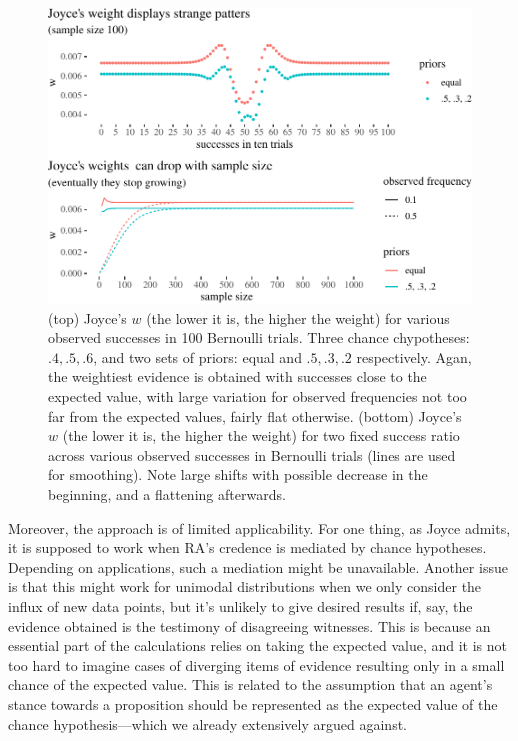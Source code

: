 \documentclass[
  10pt,
  dvipsnames,enabledeprecatedfontcommands]{scrartcl}
\begin{document}
\begin{figure}

\begin{center}\includegraphics[width=1\linewidth]{paper-outline_files/figure-latex/joyce2b-1} \end{center}

\caption{(top) Joyce's $w$ (the lower it is, the higher the weight) for various observed successes in 100 Bernoulli trials. Three chance chypotheses: $.4, .5, .6$, and two sets of priors: equal and $.5, .3, .2$ respectively. Agan, the weightiest evidence is obtained with successes close to the expected value, with  large variation for observed frequencies not too far from the expected values, fairly flat otherwise. (bottom) Joyce's $w$ (the lower it is, the higher the weight) for two fixed success ratio across various observed successes in  Bernoulli trials (lines are used for smoothing).  Note large shifts with possible decrease in the beginning, and a flattening afterwards.}
\label{fig:joyce2}
\end{figure}

Moreover, the approach is of limited applicability. For one thing, as
Joyce admits, it is supposed to work when RA's credence is mediated by
chance hypotheses. Depending on applications, such a mediation might be
unavailable. Another issue is that this might work for unimodal
distributions when we only consider the influx of new data points, but
it's unlikely to give desired results if, say, the evidence obtained is
the testimony of disagreeing witnesses. This is because an essential
part of the calculations relies on taking the expected value, and it is
not too hard to imagine cases of diverging items of evidence resulting
only in a small chance of the expected value. This is related to the
assumption that an agent's stance towards a proposition should be
represented as the expected value of the chance hypothesis---which we
already extensively argued against.
\end{document}
